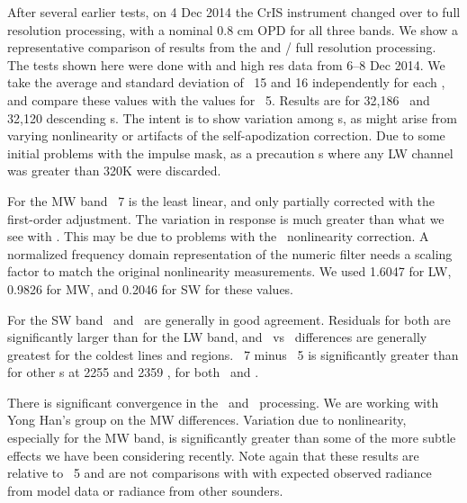 \documentclass[12pt]{article}
\begin{document}
After several earlier tests, on 4 Dec 2014 the CrIS instrument
changed over to full resolution processing, with a nominal 0.8 cm
OPD for all three bands.  We show a representative comparison of
results from the {\umbc} {\ccast} and \noaa/{\nstar} full resolution
processing.  The tests shown here were done with {\ccast} and
{\noaa} high res data from 6--8 Dec 2014.  We take the average and
standard deviation of \for\ 15 and 16 independently for each \fov,
and compare these values with the values for \fov\ 5.  Results are
for 32,186 \ccast\ and 32,120 {\noaa} descending {\for}s.  The
intent is to show variation among {\fov}s, as might arise from
varying nonlinearity or artifacts of the self-apodization correction.
Due to some initial problems with the impulse mask, as a precaution
{\for}s where any LW channel was greater than 320K were discarded.

For the MW band \fov\ 7 is the least linear, and only partially
corrected with the {\ccast} first-order adjustment.  The {\noaa}
variation in {\fov} response is much greater than what we see with
{\ccast}.  This may be due to problems with the \noaa\ nonlinearity
correction.  A normalized frequency domain representation of the
numeric filter needs a scaling factor to match the original
nonlinearity measurements.  We used 1.6047 for LW, 0.9826 for MW,
and 0.2046 for SW for these values.

For the SW band \ccast\ and \noaa\ are generally in good agreement.
Residuals for both are significantly larger than for the LW band,
and \noaa\ vs \ccast\ differences are generally greatest for the
coldest lines and regions.  \fov\ 7 minus \fov\ 5 is significantly
greater than for other \fov s at 2255 and 2359 \wnum, for both
\ccast\ and \noaa.

There is significant convergence in the \ccast\ and
\noaa\ processing.  We are working with Yong Han's group on the MW
differences.  Variation due to nonlinearity, especially for the MW
band, is significantly greater than some of the more subtle effects
we have been considering recently.  Note again that these results
are relative to \fov\ 5 and are not comparisons with with expected
observed radiance from model data or radiance from other sounders.

\end{document}

